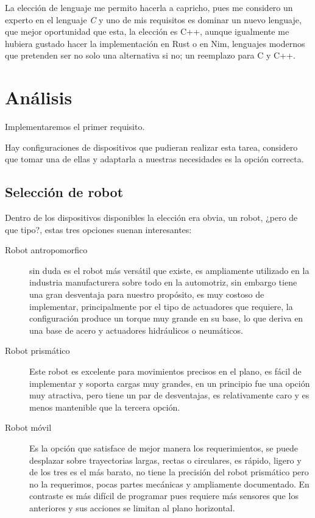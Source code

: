 La elección de lenguaje me permito hacerla a capricho, pues me considero un experto
en el lenguaje \emph{C} y uno de mis requisitos es dominar un nuevo lenguaje, que
mejor oportunidad que esta, la elección es C++, aunque igualmente me hubiera 
gustado hacer la implementación en Rust o en Nim, lenguajes modernos que 
pretenden ser no solo una alternativa si no; un reemplazo para C y C++.

\section{Análisis}
Implementaremos el primer requisito.

Hay configuraciones de dispositivos que pudieran realizar esta tarea, 
considero que tomar una de ellas y adaptarla a nuestras necesidades es la opción
correcta. 

\subsection{Selección de robot}
Dentro de los dispositivos disponibles la elección era obvia, un robot, ¿pero  de
que tipo?, estas tres opciones suenan interesantes:
\begin{description}
	\item[Robot antropomorfico] sin duda es el robot más versátil que existe,
		es ampliamente utilizado en la industria manufacturera sobre todo
		en la automotriz, sin embargo tiene una gran desventaja para 
		nuestro propósito, es muy costoso de implementar, principalmente
		por el tipo de actuadores que requiere, la configuración produce 
		un torque muy grande en su base, lo que deriva en una base de 
		acero y actuadores hidráulicos o neumáticos.
	\item[Robot prismático] Este robot es excelente para movimientos precisos 
		en el plano, es fácil de implementar y soporta cargas muy grandes,
		en un principio fue una opción muy atractiva, pero tiene un par 
		de desventajas, es relativamente caro y es menos mantenible que 
		la tercera opción.
	\item[Robot móvil] Es la opción que satisface de mejor manera los
		requerimientos, se puede desplazar sobre trayectorias largas, 
		rectas o circulares, es rápido, ligero y de los tres es el más
		barato, no tiene la precisión del robot prismático pero no la 
		requerimos, pocas partes mecánicas y ampliamente documentado. 
		En contraste es más difícil de programar pues requiere más 
		sensores que los anteriores y sus acciones se limitan al plano
		horizontal.
\end{description}

